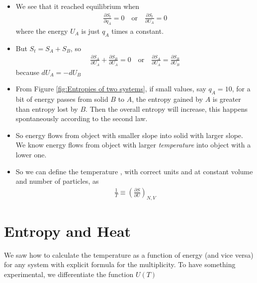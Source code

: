 \documentclass{book}
\begin{document}
\begin{itemize}
	\item We see that it reached equilibrium when
	      \begin{align}
		      \frac{\partial S_{t}}{\partial q_A} = 0
		      \quad \text{or} \quad \frac{\partial S_{t}}{\partial U_A} = 0
	      \end{align}
	      where the energy $U_A$ is just $q_A$ times a constant.
	\item But $S_t = S_A + S_B$, so
	      \begin{align}
		      \frac{\partial S_A}{\partial U_A} + \frac{\partial S_B}{\partial U_A} = 0 \quad \text{or} \quad
		      \frac{\partial S_A}{\partial U_A} = \frac{\partial S_B}{\partial U_B}
	      \end{align}
	      because $dU_A = -dU_B$
	\item From Figure \ref{fig:Entropies of two systems}, if small values, say $q_A= 10$, for a bit of energy
	      passes from solid $B$ to $A$, the entropy gained by $A$ is greater than entropy lost by $B$. Then the overall
	      entropy will increase, this happens spontaneously according to the second law.
	\item So energy flows from object with smaller slope into solid with larger slope. We know energy flows from
	      object with larger \textit{temperature} into object with a lower one.
	\item So we can define the temperature , with correct units and at constant volume and
	      number of particles, as
	      \begin{align}
		      \frac{1}{T} \equiv \left( \frac{\partial S}{\partial U} \right)_{N,V}
	      \end{align}
\end{itemize}

\section{Entropy and Heat}%
\label{sec:entropy and heat}

We saw how to calculate the temperature as a function of energy (and vice versa) for any system with
explicit formula for the multiplicity. To have something experimental, we differentiate the function
$U(T)$
\end{document}

